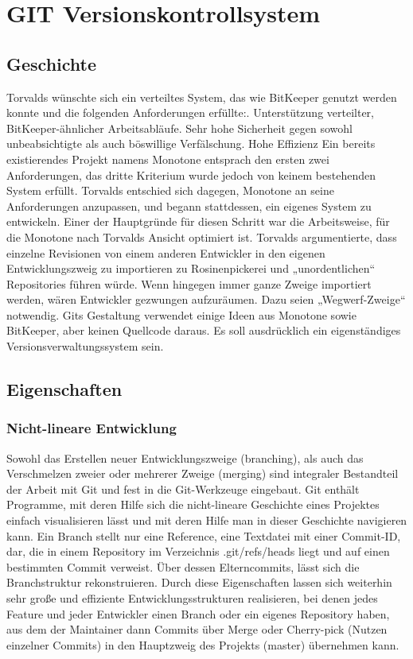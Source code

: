\section{GIT Versionskontrollsystem}
\subsection{Geschichte}
Torvalds wünschte sich ein verteiltes System, das wie BitKeeper genutzt werden konnte und die folgenden Anforderungen erfüllte:. Unterstützung verteilter, BitKeeper-ähnlicher Arbeitsabläufe. Sehr hohe Sicherheit gegen sowohl unbeabsichtigte als auch böswillige Verfälschung. Hohe Effizienz\newline
Ein bereits existierendes Projekt namens Monotone entsprach den ersten zwei Anforderungen, das dritte Kriterium wurde jedoch von keinem bestehenden System erfüllt.
Torvalds entschied sich dagegen, Monotone an seine Anforderungen anzupassen, und begann stattdessen, ein eigenes System zu entwickeln. Einer der Hauptgründe für diesen Schritt war die Arbeitsweise, für die Monotone nach Torvalds Ansicht optimiert ist. Torvalds argumentierte, dass einzelne Revisionen von einem anderen Entwickler in den eigenen Entwicklungszweig zu importieren zu Rosinenpickerei und „unordentlichen“ Repositories führen würde. Wenn hingegen immer ganze Zweige importiert werden, wären Entwickler gezwungen aufzuräumen. Dazu seien „Wegwerf-Zweige“ notwendig.
Gits Gestaltung verwendet einige Ideen aus Monotone sowie BitKeeper, aber keinen Quellcode daraus. Es soll ausdrücklich ein eigenständiges Versionsverwaltungssystem sein.
\subsection{Eigenschaften}
\subsubsection{Nicht-lineare Entwicklung}
Sowohl das Erstellen neuer Entwicklungszweige (branching), als auch das Verschmelzen zweier oder mehrerer Zweige (merging) sind integraler Bestandteil der Arbeit mit Git und fest in die Git-Werkzeuge eingebaut. Git enthält Programme, mit deren Hilfe sich die nicht-lineare Geschichte eines Projektes einfach visualisieren lässt und mit deren Hilfe man in dieser Geschichte navigieren kann. Ein Branch stellt nur eine Reference, eine Textdatei mit einer Commit-ID, dar, die in einem Repository im Verzeichnis .git/refs/heads liegt und auf einen bestimmten Commit verweist. Über dessen Elterncommits, lässt sich die Branchstruktur rekonstruieren. Durch diese Eigenschaften lassen sich weiterhin sehr große und effiziente Entwicklungsstrukturen realisieren, bei denen jedes Feature und jeder Entwickler einen Branch oder ein eigenes Repository haben, aus dem der Maintainer dann Commits über Merge oder Cherry-pick (Nutzen einzelner Commits) in den Hauptzweig des Projekts (master) übernehmen kann.
